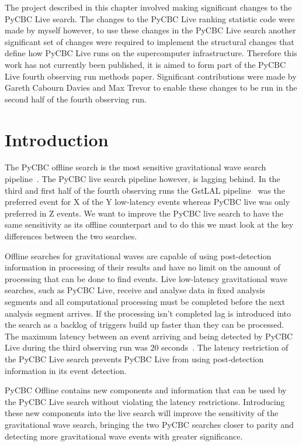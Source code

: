 The project described in this chapter involved making significant changes to the PyCBC Live search. The changes to the PyCBC Live ranking statistic code were made by myself however, to use these changes in the PyCBC Live search another significant set of changes were required to implement the structural changes that define how PyCBC Live runs on the supercomputer infrastructure. Therefore this work has not currently been published, it is aimed to form part of the PyCBC Live fourth observing run methods paper. Significant contributions were made by Gareth Cabourn Davies and Max Trevor to enable these changes to be run in the second half of the fourth observing run.

\section{\label{5:sec:introduction}Introduction}

The PyCBC offline search is the most sensitive gravitational wave search pipeline~\cite{PyCBC:2016, PyCBC:2017, PyCBC_package:2021}. The PyCBC live search pipeline however, is lagging behind. In the third and first half of the fourth observing runs the GstLAL pipeline~\cite{GstLAL:2020} was the preferred event for X of the Y low-latency events whereas PyCBC live was only preferred in Z events. We want to improve the PyCBC live search to have the same sensitivity as its offline counterpart and to do this we must look at the key differences between the two searches.

Offline searches for gravitational waves are capable of using post-detection information in processing of their results and have no limit on the amount of processing that can be done to find events. Live low-latency gravitational wave searches, such as PyCBC Live, receive and analyse data in fixed analysis segments and all computational processing must be completed before the next analysis segment arrives. If the processing isn't completed lag is introduced into the search as a backlog of triggers build up faster than they can be processed. The maximum latency between an event arriving and being detected by PyCBC Live during the third observing run was $20$ seconds~\cite{PyCBC:2017}. The latency restriction of the PyCBC Live search prevents PyCBC Live from using post-detection information in its event detection.

PyCBC Offline contains new components and information that can be used by the PyCBC Live search without violating the latency restrictions. Introducing these new components into the live search will improve the sensitivity of the gravitational wave search, bringing the two PyCBC searches closer to parity and detecting more gravitational wave events with greater significance.

